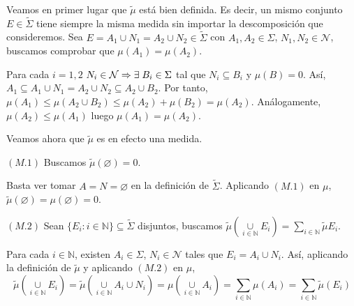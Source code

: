 \documentclass[12pt,a4paper]{article}
\newcommand{\N}{\mathbb{N}}
\newcommand{\smallcup}{\mathop{\cup}\limits}
\newcommand{\smallsum}{\mathop{\sum}\limits}
\begin{document}
Veamos en primer lugar que $\tilde{\mu}$ está bien definida. Es decir, un mismo conjunto $E \in \tilde{\Sigma}$ tiene siempre
la misma medida sin importar la descomposición que consideremos. Sea $E = A_1 \cup N_1 = A_2 \cup N_2 \in \tilde{\Sigma}$ con
$A_1, A_2 \in \Sigma$, $N_1, N_2 \in \mathcal{N}$, buscamos comprobar que $\mu(A_1) = \mu(A_2)$.
\vspace{2mm}
\begin{adjustwidth}{0.1\textwidth}{}
    Para cada $i=1,2$ $N_i \in \mathcal{N} \Rightarrow \exists \hspace{1mm} B_i \in \Sigma$ tal que $N_i \subseteq B_i$ y $\mu(B) = 0$.
    \newline
    Así, $A_1 \subseteq A_1 \cup N_1 = A_2 \cup N_2 \subseteq A_2 \cup B_2$.
    \newline
    Por tanto, $\mu(A_1) \leq \mu(A_2 \cup B_2) \leq \mu(A_2) + \mu(B_2) = \mu(A_2)$.
    \newline
    Análogamente, $\mu(A_2) \leq \mu(A_1)$ luego $\mu(A_1) = \mu(A_2)$.
\end{adjustwidth}

\vspace{4mm}
Veamos ahora que $\tilde{\mu}$ es en efecto una medida.

\vspace{2mm}
$(M.1)$ Buscamos $\tilde{\mu}(\varnothing) = 0$.
\begin{adjustwidth}{0.1\textwidth}{}
    Basta ver tomar $A = N = \varnothing$ en la definición de $\tilde{\Sigma}$.
    \newline
    Aplicando $(M.1)$ en $\mu$, $\tilde{\mu}(\varnothing) = \mu(\varnothing) = 0$.
\end{adjustwidth}

\vspace{5mm}
$(M.2)$ Sean $\{E_i : i \in \N\} \subseteq \tilde{\Sigma}$ disjuntos, buscamos $\tilde{\mu}(\smallcup_{i\in\N}E_i) = \smallsum_{i\in\N}\tilde{\mu}E_i$.
\begin{adjustwidth}{0.1\textwidth}{}
    \vspace{1mm}
    Para cada $i \in \N$, existen $A_i\in \Sigma$, $N_i \in \mathcal{N}$ tales que $E_i = A_i \cup N_i$.
    \vspace{1mm}\newline
    Así, aplicando la definición de $\tilde{\mu}$ y aplicando $(M.2)$ en $\mu$,
    \\[-3ex]
    $$\tilde{\mu}(\smallcup_{i\in\N}E_i) = \tilde{\mu}(\smallcup_{i\in\N}A_i \cup N_i) = \mu(\smallcup_{i\in\N}A_i) = \smallsum_{i\in\N}\mu(A_i) = \smallsum_{i\in\N}\tilde{\mu}(E_i)$$
\end{adjustwidth}
\end{document}

